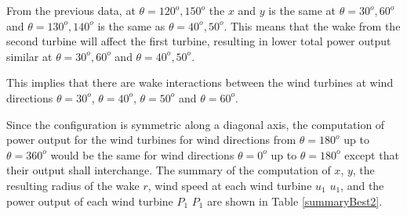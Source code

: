 From the previous data, at $\theta=120^{o},150^{o}$ the $x$ and $y$ is the same at $\theta=30^{o},60^{o}$ and $\theta=130^{o},140^{o}$ is the same as $\theta=40^{o},50^{o}$. This means that the wake from the second turbine will affect the first turbine, resulting in lower total power output similar at $\theta=30^{o},60^{o}$ and $\theta=40^{o},50^{o}$.




This implies that there are wake interactions between the wind turbines at wind directions $\theta=30^o$, $\theta=40^o$, $\theta=50^o$ and $\theta=60^o$.

Since the configuration is symmetric along a diagonal axis, the computation of power output for the wind turbines for wind directions from $\theta=180^o$ up to $\theta=360^o$ would be the same for wind directions $\theta=0^o$ up to $\theta=180^o$ except that their output shall interchange. The summary of the computation of $x$, $y$, the resulting radius of the wake $r$, wind speed at each wind turbine $u_1$ $u_1$, and the power output of each wind turbine $P_1$ $P_1$ are shown in Table \ref{summaryBest2}.


